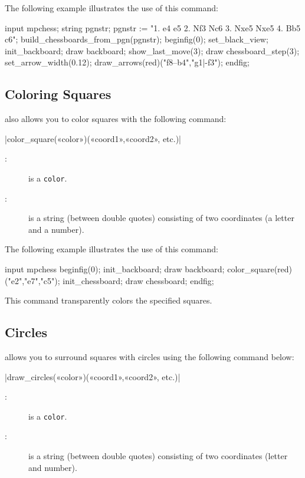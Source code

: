 \documentclass[english]{ltxdoc}
\begin{document}
The following example illustrates the use of this command:

\begin{ExempleMP}
input mpchess;
string pgnstr;
pgnstr := "1. e4 e5 2. Nf3 Nc6 3. Nxe5 Nxe5 4. Bb5 c6";
build_chessboards_from_pgn(pgnstr);
beginfig(0);
set_black_view;
init_backboard;
draw backboard;
show_last_move(3);
draw chessboard_step(3); %
set_arrow_width(0.12);
draw_arrows(red)("f8--b4","g1|-f3");
endfig;
\end{ExempleMP}

\subsection{Coloring Squares}

\mpchess also allows you to color squares with the following command:

\commande|color_square(«color»)(«coord1»,«coord2», etc.)|\smallskip

\begin{description}
\item[:] is a \MP{} \lstinline+color+.
\item[:] is a string (between double quotes) consisting of two
coordinates (a letter and a number). 
\end{description}

The following example illustrates the use of this command:

\begin{ExempleMP}
input mpchess
beginfig(0);
init_backboard;
draw backboard;
color_square(red)("e2","e7","c5");
init_chessboard;
draw chessboard;
endfig;
\end{ExempleMP}

This command transparently colors the specified squares.

\subsection{Circles}

\mpchess allows you to surround squares with circles using the following command
 below:

\commande|draw_circles(«color»)(«coord1»,«coord2», etc.)|\smallskip

\begin{description}
\item[:] is a \MP{} \lstinline+color+.
\item[:] is a string (between double quotes) consisting of two
coordinates (letter and number). 
\end{description}
\end{document}
